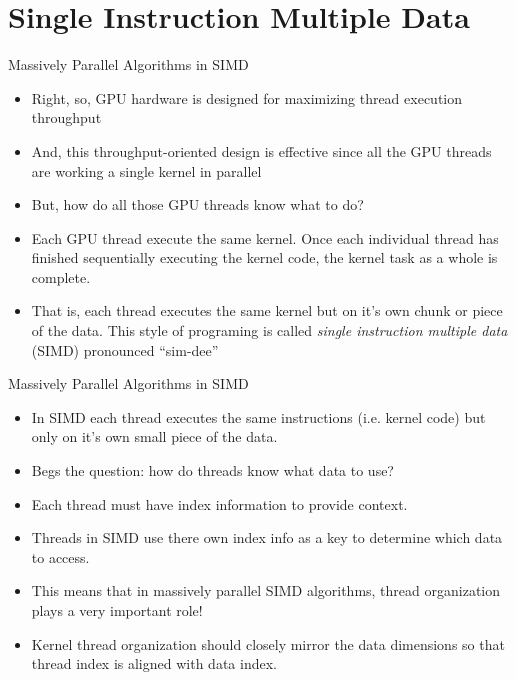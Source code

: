 \documentclass[handout]{beamer}
\begin{document}
\section{Single Instruction Multiple Data}
\begin{frame}{Massively Parallel Algorithms in SIMD}
\begin{itemize}
	\item<1->Right, so, GPU hardware is designed for maximizing thread execution throughput
	\item<2->And, this throughput-oriented design is effective since all the GPU threads are working a single kernel in parallel
	\item<3->But, how do all those GPU threads know what to do?
	\item<4->Each GPU thread execute the same kernel.  Once each individual thread has finished sequentially executing the kernel code, the kernel task as a whole is complete.  
	\item<5->That is, each thread executes the same kernel but on it's own chunk or piece of the data.  This style of programing is called \emph{single instruction multiple data} (SIMD) pronounced ``sim-dee''
\end{itemize}
\end{frame}


\begin{frame}{Massively Parallel Algorithms in SIMD}
\begin{itemize}
	\item<1->In SIMD each thread executes the same instructions (i.e. kernel code) but only on it's own small piece of the data.
	\item<2->Begs the question: how do threads know what data to use?
	\item<3->Each thread must have index information to provide context.
	\item<4->Threads in SIMD use there own index info as a key to determine which data to access.
	\item<5->This means that in massively parallel SIMD algorithms, thread organization plays a very important role!
	\item<6->Kernel thread organization should closely mirror the data dimensions so that thread index is aligned with data index.  
\end{itemize}
\end{frame}
\end{document}
